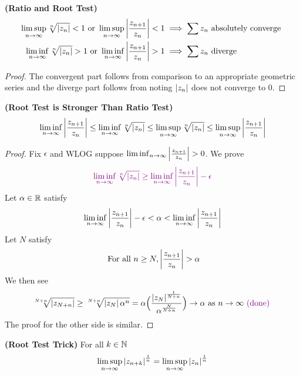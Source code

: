 \documentclass{report}
\begin{document}
\begin{theorem}
\label{Ratio and Root Test}
\textbf{(Ratio and Root Test)} 
\begin{align*}
  \limsup_{n\to\infty} \sqrt[n]{\abso{z_n}}<1 \text{ or }\limsup_{n\to\infty} \abso{\frac{z_{n+1}}{z_n}}<1&\implies \sum z_n\text{ absolutely converge }\\
  \liminf_{n\to\infty} \sqrt[n]{\abso{z_n}}>1\text{ or }\liminf_{n\to\infty} \abso{\frac{z_{n+1}}{z_n}}>1 &\implies \sum  z_n\text{ diverge }
\end{align*}
\end{theorem}
\begin{proof}
The convergent part follows from comparison to an appropriate geometric series and the diverge part follows from noting $\left|z_n\right|$ does not converge to $0$.
\end{proof}
\begin{theorem}
\label{Root Test is Stronger Than Ratio Test}
\textbf{(Root Test is Stronger Than Ratio Test)}
\begin{align*}
\liminf_{n\to\infty} \left|\frac{z_{n+1}}{z_n}\right|\leq \liminf_{n\to\infty} \sqrt[n]{\left|z_n\right|} \leq \limsup_{n\to\infty} \sqrt[n]{\left|z_n\right|} \leq \limsup_{n\to\infty} \left|\frac{z_{n+1}}{z_n}\right|
\end{align*}
\end{theorem}
\begin{proof}
Fix $\epsilon $ and WLOG suppose $\liminf_{n\to\infty} \abso{\frac{z_{n+1}}{z_n}}>0$. We prove 
\begin{align*}
  \textcolor{violet}{\liminf_{n\to\infty} \sqrt[n]{\left|z_n\right|}\geq \liminf_{n\to\infty} \left|\frac{z_{n+1}}{z_n}\right|-\epsilon  }
\end{align*}
Let $\alpha \in\mathbb{R} $ satisfy 
\begin{align*}
\liminf_{n\to\infty}  \left|\frac{z_{n+1}}{z_n}\right|-\epsilon <\alpha < \liminf_{n\to\infty} \left|\frac{z_{n+1}}{z_n}\right|
\end{align*}
Let $N$ satisfy  
\begin{align*}
\text{ For all }n\geq N,\abso{\frac{z_{n+1}}{z_n}}>\alpha  
\end{align*}
We then see 
\begin{align*}
  \sqrt[N+n]{\left|z_{N+n}\right|}\geq \sqrt[N+n]{\left|z_N\right|\alpha^n}=\alpha \Big(\frac{\left|z_N\right|^{\frac{1}{N+n}}}{\alpha ^{\frac{N}{N+n}}} \Big)\to \alpha \text{ as }n\to \infty \textcolor{violet}{\text{ (done) }}
\end{align*}
The proof for the other side is similar.
\end{proof}
\begin{theorem}
\label{Root Test Trick}
\textbf{(Root Test Trick)} For all $k\in\mathbb{N}$ 
\begin{align*}
\limsup_{n\to\infty} \left|z_{n+k}\right|^{\frac{1}{n}}=\limsup_{n\to\infty} \left|z_n\right|^{\frac{1}{n}}
\end{align*}
\end{theorem}
\end{document}
